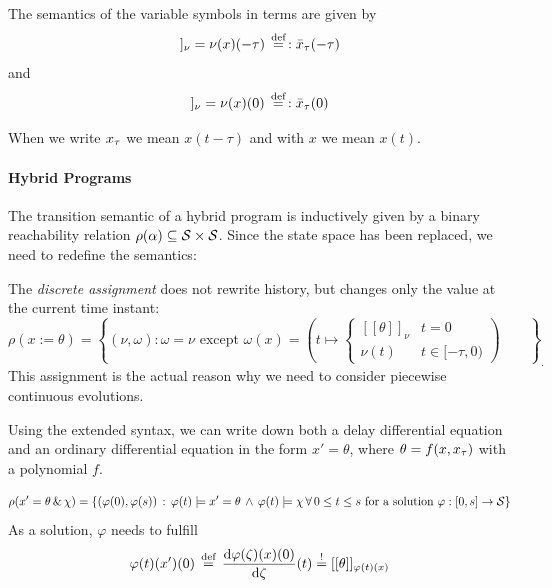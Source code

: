 \documentclass[10pt]{article}
\begin{document}
The semantics of the variable symbols in terms are given by
\begin{equation}
    [[\xtau]]_\nu=\nu(x)(-\tau)\defeq:\xbartau(-\tau)
\end{equation}
and
\begin{equation}
    [[x]]_\nu=\nu(x)(0)\defeq:\xbartau(0)
\end{equation}

When we write $x_{\tau}$ we mean $x(t-\tau)$ and with $x$ we mean $x(t)$.

\paragraph{Hybrid Programs}\label{hybrid-programs}

The transition semantic of a hybrid program is inductively given by a binary reachability relation $\rho(\alpha)\subseteq\mathcal{S}\times\mathcal{S}$. Since the state space has been replaced, we need to redefine the semantics:

The \emph{discrete assignment} does not rewrite history, but changes only the value at the current time instant:
\begin{equation}
\rho(x:=\theta) = \left\{(\nu,\omega): \omega = \nu \text{ except } \omega(x)=\left(t\mapsto\begin{cases}[[\theta]]_\nu & t=0\\ \nu(t) &t\in[-\tau,0)\end{cases}\right)\qquad\right\}_.
\end{equation}
This assignment is the actual reason why we need to consider piecewise continuous evolutions.


Using the extended syntax, we can write down both a delay differential equation and an ordinary differential equation in the form $x'=\theta$, where $\theta=f(x,x_{\tau})$ with a polynomial $f$.

\begin{equation}
    \rho(x'=\theta\,\&\,\chi) = \left\{ (\varphi(0),\varphi(s))\,:\,\varphi(t)\models x'=\theta\,\wedge\,\varphi(t)\models\chi\,\forall\,0\leq t\leq s\text{ for a solution } \varphi:[0,s]\rightarrow\mathcal{S} \right\}
\end{equation} As a solution, $\varphi$ needs to fulfill \begin{equation}
    \varphi(t)(x')(0) \,\stackrel{\text{def}}{=}\, \frac{\text{d} \varphi(\zeta)(x)(0)}{\text{d} \zeta}(t) \stackrel{!}{=} [[\theta]]_{\varphi(t)(x)}
\end{equation}
\end{document}
